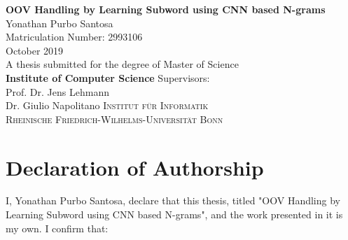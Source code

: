 \documentclass[a4paper,12pt]{report}
\begin{document}




\thispagestyle{empty}
\vskip40mm
\begin{center}
\LARGE\textbf{OOV Handling by Learning Subword using CNN based N-grams}\\
\vskip 2.5cm
\large Yonathan Purbo Santosa\\
Matriculation Number: 2993106\\
October 2019\\
\vskip 2cm
\small A thesis submitted for the
degree of Master of Science\\
\large \textbf{Institute of Computer Science}
\vskip 2cm
Supervisors:\\
Prof. Dr. Jens Lehmann\\
Dr. Giulio Napolitano
\vfill
\textsc{Institut f{\"u}r Informatik}\\
\textsc{Rheinische Friedrich-Wilhelms-Universit{\"a}t Bonn}
\end{center}

\newpage
\thispagestyle{empty}
\mbox{}

\chapter*{Declaration of Authorship}
I, Yonathan Purbo Santosa, declare that this thesis, titled "OOV Handling by
Learning Subword using CNN based N-grams", and the work presented in
it is my own. I confirm that:
\end{document}
